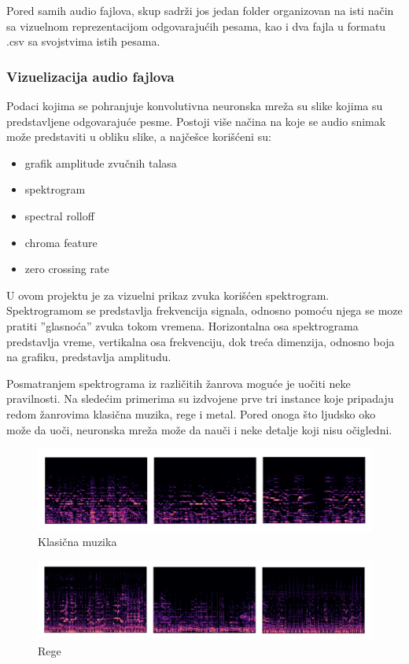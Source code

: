 \documentclass{article}
\begin{document}
Pored samih audio fajlova, skup sadrži jos jedan folder organizovan na isti način sa vizuelnom reprezentacijom odgovarajućih pesama, kao i dva fajla u formatu .csv sa svojstvima istih pesama.

\subsubsection{Vizuelizacija audio fajlova}
Podaci kojima se pohranjuje konvolutivna neuronska mreža su slike kojima su predstavljene odgovarajuće pesme. Postoji više načina na koje se audio snimak može predstaviti u obliku slike, a najčešce korišćeni su:
\begin{itemize}
    \item grafik amplitude zvučnih talasa
    \item spektrogram
    \item spectral rolloff
    \item chroma feature
    \item zero crossing rate
\end{itemize}

U ovom projektu je za vizuelni prikaz zvuka korišćen spektrogram. Spektrogramom se predstavlja frekvencija signala, odnosno pomoću njega se moze pratiti ''glasnoća'' zvuka tokom vremena. Horizontalna osa spektrograma predstavlja vreme, vertikalna osa frekvenciju, dok treća dimenzija, odnosno boja na grafiku, predstavlja amplitudu.


Posmatranjem spektrograma iz različitih žanrova moguće je uočiti neke pravilnosti. Na sledećim primerima su izdvojene prve tri instance koje pripadaju redom žanrovima klasična muzika, rege i metal. Pored onoga što ljudsko oko može da uoči, neuronska mreža može da nauči i neke detalje koji nisu očigledni.

\begin{figure}[h]
\centering
\includegraphics[scale=0.65]{classical}
\caption{Klasična muzika}
\end{figure}

\begin{figure}[h]
\centering
\includegraphics[scale=0.65]{reggae}
\caption{Rege}
\end{figure}
\end{document}
